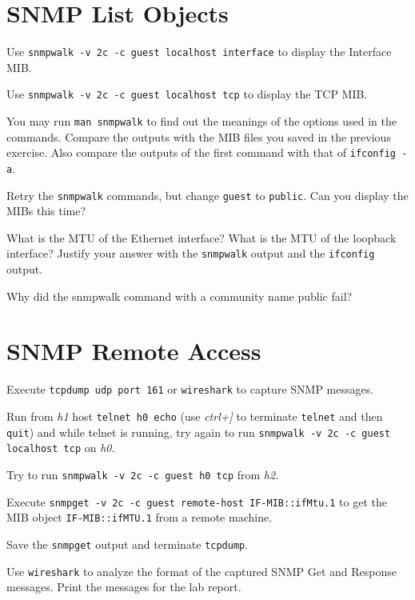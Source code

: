 \documentclass{../UTNetLab}
\begin{document}
\section{SNMP List Objects}
    Use \lstinline{snmpwalk -v 2c -c guest localhost interface} to display the Interface MIB.

    Use \lstinline{snmpwalk -v 2c -c guest localhost tcp} to display the TCP MIB.

    You may run \lstinline{man snmpwalk} to find out the meanings of the options used in the commands. Compare the outputs with the MIB files you saved in the previous exercise. Also compare the outputs of the first command with that of \lstinline{ifconfig -a}.

    Retry the \lstinline{snmpwalk} commands, but change \lstinline{guest} to \lstinline{public}. Can you display the MIBs this time?
    
    \begin{report}
    \item What is the MTU of the Ethernet interface? What is the MTU of the loopback interface? Justify your answer with the \lstinline{snmpwalk} output and the \lstinline{ifconfig} output.
    
    \item Why did the snmpwalk command with a community name public fail?
    \end{report}

\section{SNMP Remote Access}
    Execute \lstinline{tcpdump udp port 161} or \lstinline{wireshark} to capture SNMP messages.

    Run from \textit{h1} host \lstinline[emph={h0}]{telnet h0 echo} (use \textit{ctrl+]} to terminate \lstinline{telnet} and then \lstinline{quit}) and while telnet is running, try again to run \lstinline{snmpwalk -v 2c -c guest localhost tcp} on \textit{h0}.

    Try to run \lstinline[emph={h0}]{snmpwalk -v 2c -c guest h0 tcp} from \textit{h2}.

    Execute \lstinline[emph={your-host, remote-host}]{snmpget -v 2c -c guest remote-host IF-MIB::ifMtu.1} to get the MIB object \texttt{IF-MIB::ifMTU.1} from a remote machine.

    Save the \lstinline{snmpget} output and terminate \lstinline{tcpdump}.

    Use \lstinline{wireshark} to analyze the format of the captured SNMP Get and Response messages. Print the messages for the lab report.
    
\end{document}
